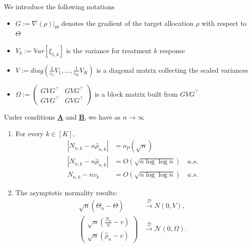 \begin{theorem}\label{thm:normality-gen-erade}
	We introduce the following notations
	\begin{itemize}
		\item \(G := \nabla (\rho)\big|_{\Theta}\) denotes the gradient of the target allocation $\rho$ with respect to $\Theta$
		\item \(V_k := \mathbb{V}ar[\xi_{1,k}]\)  is the variance for treatment \(k\) response
		\item \(V := diag\left(\frac{1}{v_1}V_1, \dots, \frac{1}{v_K}V_K\right)\) is a diagonal matrix collecting the scaled variances
		\item \(\Omega := 
		\begin{pmatrix}
			GVG^{\top } & GVG^{\top } \\
			GVG^{\top } & GVG^{\top }
		\end{pmatrix}\) is a block matrix built from \(GVG^{\top }\)
	\end{itemize}
	Under conditions \hyperlink{CA}{\textbf{A}} and \hyperlink{CB}{\textbf{B}}, we have as \(n \to \infty\)
	
	\begin{enumerate}[label=(\roman*)]
		\item  For every \(k \in [K]\),
		\begin{align}
			|N_{n,k} - n\hat{\rho}_{n,k}| &= o_P(\sqrt{n})\label{eq:thm-res-1}\\
			|N_{n,k} - n\hat{\rho}_{n,k}| &= O(\sqrt{n \log\log n})\quad a.s.\label{eq:thm-res-2}\\
			N_{n,k}-n v_k&=O(\sqrt{n\log\log n})\quad a.s.\label{eq:thm-res-3}
		\end{align}
		\item The asymptotic normality results:
		\begin{align}\label{eq:thm-res-4}
			\sqrt{n}(\hat{\Theta}_n - \Theta) &\xrightarrow{\mathcal{D}} N(0,V),\\
			\label{eq:thm-res-5}
			\begin{pmatrix}
				\sqrt{n} \left( \frac{N_n}{n} - v \right)\\
				\sqrt{n} (\hat{\rho}_n - v)
			\end{pmatrix}
			&\xrightarrow{\mathcal{D}} \mathcal{N}(0,\Omega).
		\end{align}		
	\end{enumerate}
\end{theorem}


